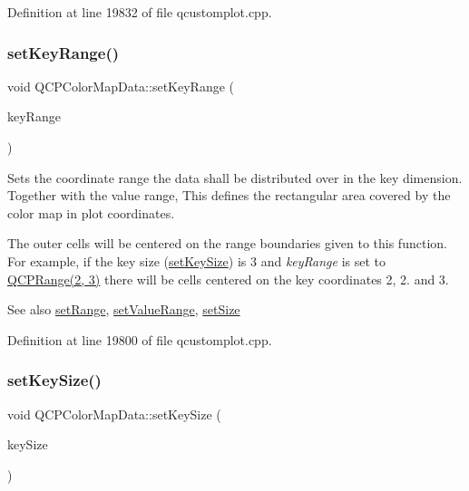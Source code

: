 Definition at line 19832 of file qcustomplot.\+cpp.

\mbox{\label{class_q_c_p_color_map_data_a0738c485f3c9df9ea1241b7a8bb6a86e}} 
\subsubsection{\texorpdfstring{set\+Key\+Range()}{setKeyRange()}}
{\footnotesize\ttfamily void Q\+C\+P\+Color\+Map\+Data\+::set\+Key\+Range (\begin{DoxyParamCaption}\item[{const \hyperlink{class_q_c_p_range}{Q\+C\+P\+Range} \&}]{key\+Range }\end{DoxyParamCaption})}

Sets the coordinate range the data shall be distributed over in the key dimension. Together with the value range, This defines the rectangular area covered by the color map in plot coordinates.

The outer cells will be centered on the range boundaries given to this function. For example, if the key size (\hyperlink{class_q_c_p_color_map_data_ac7ef70e383aface34b44dbde49234b6b}{set\+Key\+Size}) is 3 and {\itshape key\+Range} is set to {\ttfamily \hyperlink{class_q_c_p_range}{Q\+C\+P\+Range(2, 3)}} there will be cells centered on the key coordinates 2, 2. and 3.

\begin{DoxySeeAlso}{See also}
\hyperlink{class_q_c_p_color_map_data_aad9c1c7c703c1339489fc730517c83d4}{set\+Range}, \hyperlink{class_q_c_p_color_map_data_ada1b2680ba96a5f4175b6d341cf75d23}{set\+Value\+Range}, \hyperlink{class_q_c_p_color_map_data_a0d9ff35c299d0478b682bfbcdd9c097e}{set\+Size} 
\end{DoxySeeAlso}


Definition at line 19800 of file qcustomplot.\+cpp.

\mbox{\label{class_q_c_p_color_map_data_ac7ef70e383aface34b44dbde49234b6b}} 
\subsubsection{\texorpdfstring{set\+Key\+Size()}{setKeySize()}}
{\footnotesize\ttfamily void Q\+C\+P\+Color\+Map\+Data\+::set\+Key\+Size (\begin{DoxyParamCaption}\item[{int}]{key\+Size }\end{DoxyParamCaption})}

